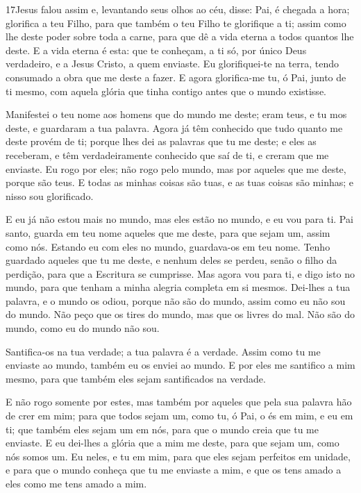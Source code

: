 \medskip

\lettrine{17} Jesus falou assim e, levantando seus olhos ao
céu, disse: Pai, é chegada a hora; glorifica a teu Filho, para que
também o teu Filho te glorifique a ti; assim como lhe deste
poder sobre toda a carne, para que dê a vida eterna a todos quantos
lhe deste. E a vida eterna é esta: que te conheçam, a ti só, por
único Deus verdadeiro, e a Jesus Cristo, a quem enviaste. Eu
glorifiquei-te na terra, tendo consumado a obra que me deste a
fazer. E agora glorifica-me tu, ó Pai, junto de ti mesmo, com
aquela glória que tinha contigo antes que o mundo existisse.

Manifestei o teu nome aos homens que do mundo me deste; eram teus,
e tu mos deste, e guardaram a tua palavra. Agora já têm
conhecido que tudo quanto me deste provém de ti; porque lhes dei
as palavras que tu me deste; e eles as receberam, e têm
verdadeiramente conhecido que saí de ti, e creram que me enviaste.
Eu rogo por eles; não rogo pelo mundo, mas por aqueles que me
deste, porque são teus. E todas as minhas coisas são tuas, e
as tuas coisas são minhas; e nisso sou glorificado.

E eu já não estou mais no mundo, mas eles estão no mundo, e eu
vou para ti. Pai santo, guarda em teu nome aqueles que me deste,
para que sejam um, assim como nós. Estando eu com eles no
mundo, guardava-os em teu nome. Tenho guardado aqueles que tu me
deste, e nenhum deles se perdeu, senão o filho da perdição, para que
a Escritura se cumprisse. Mas agora vou para ti, e digo isto
no mundo, para que tenham a minha alegria completa em si mesmos.
Dei-lhes a tua palavra, e o mundo os odiou, porque não são do
mundo, assim como eu não sou do mundo. Não peço que os tires
do mundo, mas que os livres do mal. Não são do mundo, como eu
do mundo não sou.

Santifica-os na tua verdade; a tua palavra é a verdade.
Assim como tu me enviaste ao mundo, também eu os enviei ao
mundo. E por eles me santifico a mim mesmo, para que também
eles sejam santificados na verdade.

E não rogo somente por estes, mas também por aqueles que pela sua
palavra hão de crer em mim; para que todos sejam um, como tu,
ó Pai, o és em mim, e eu em ti; que também eles sejam um em nós,
para que o mundo creia que tu me enviaste. E eu dei-lhes a
glória que a mim me deste, para que sejam um, como nós somos um.
Eu neles, e tu em mim, para que eles sejam perfeitos em
unidade, e para que o mundo conheça que tu me enviaste a mim, e que
os tens amado a eles como me tens amado a mim.

